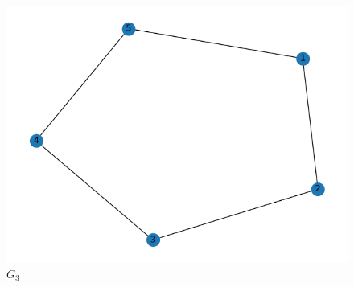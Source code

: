 \documentclass[11pt,a4paper,openright,oneside]{book}
\numberwithin{equation}{section}
\begin{document}
{\begin{figure}[H]
\begin{minipage}[t]{0.32\linewidth}
        \includegraphics[width=\linewidth]{media/graph-backprop-3.png}
        \caption*{$G_3$}
    \end{minipage}


\end{figure}}
\end{document}
